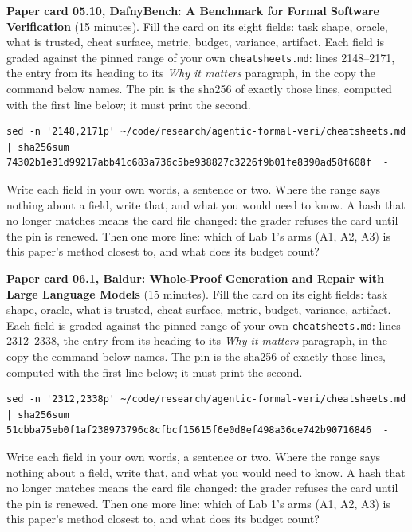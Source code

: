 \documentclass[11pt]{article}
\begin{document}
\begin{problem}\label{prob:B3}
\textbf{Paper card 05.10, DafnyBench: A Benchmark for Formal Software Verification} (15 minutes). Fill the card on its eight
fields: task shape, oracle, what is trusted, cheat surface, metric, budget,
variance, artifact. Each field is graded against the pinned range of your own
\texttt{cheatsheets.md}: lines 2148--2171, the entry from its heading to its
\emph{Why it matters} paragraph, in the copy the command below names. The pin
is the sha256 of exactly those lines, computed with the first line below; it
must print the second.
{\small
\begin{verbatim}
sed -n '2148,2171p' ~/code/research/agentic-formal-veri/cheatsheets.md | sha256sum
74302b1e31d99217abb41c683a736c5be938827c3226f9b01fe8390ad58f608f  -
\end{verbatim}
}
Write each field in your own words, a sentence or two. Where the range says
nothing about a field, write that, and what you would need to know. A hash
that no longer matches means the card file changed: the grader refuses the
card until the pin is renewed. Then one more line: which of Lab 1's arms
(A1, A2, A3) is this paper's method closest to, and what does its budget count?
\end{problem}

\begin{problem}\label{prob:B4}
\textbf{Paper card 06.1, Baldur: Whole-Proof Generation and Repair with Large Language Models} (15 minutes). Fill the card on its eight
fields: task shape, oracle, what is trusted, cheat surface, metric, budget,
variance, artifact. Each field is graded against the pinned range of your own
\texttt{cheatsheets.md}: lines 2312--2338, the entry from its heading to its
\emph{Why it matters} paragraph, in the copy the command below names. The pin
is the sha256 of exactly those lines, computed with the first line below; it
must print the second.
{\small
\begin{verbatim}
sed -n '2312,2338p' ~/code/research/agentic-formal-veri/cheatsheets.md | sha256sum
51cbba75eb0f1af238973796c8cfbcf15615f6e0d8ef498a36ce742b90716846  -
\end{verbatim}
}
Write each field in your own words, a sentence or two. Where the range says
nothing about a field, write that, and what you would need to know. A hash
that no longer matches means the card file changed: the grader refuses the
card until the pin is renewed. Then one more line: which of Lab 1's arms
(A1, A2, A3) is this paper's method closest to, and what does its budget count?
\end{problem}
\end{document}
